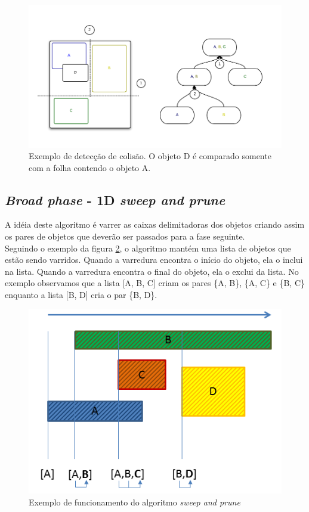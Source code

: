 \begin{figure}[H]
  \includegraphics[scale=0.4]{AABBTree1.png}
  \caption{Exemplo de detecção de colisão. O objeto D é comparado somente com a folha contendo o objeto A.}
  \label{aabbTree}
\end{figure}

\subsection{\textit{Broad phase} - 1D \textit{sweep and prune}}

A idéia deste algoritmo é varrer as caixas delimitadoras dos objetos criando assim os pares de objetos que deverão ser passados para a fase seguinte. \\

Seguindo o exemplo da figura \ref{sweep}, o algoritmo mantém uma lista de objetos que estão sendo varridos. Quando a varredura encontra o início do objeto, ela o inclui na lista. 
Quando a varredura encontra o final do objeto, ela o exclui da lista. No exemplo observamos que a lista [A, B, C] criam os pares \{A, B\}, \{A, C\} e \{B, C\} 
enquanto a lista [B, D] cria o par \{B, D\}. \\

\begin{figure}[!htbp]
  \centering
  \includegraphics[scale=0.7]{sp.png}
  \caption{Exemplo de funcionamento do algoritmo \textit{sweep and prune} \protect\cite{broad:sweep}}
  \label{sweep}
\end{figure}


